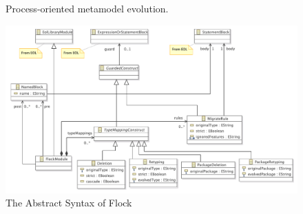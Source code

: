 \begin{figure}
	\centering
	\caption{Process-oriented metamodel evolution.}
\label{fig:po_mms}
\end{figure}

\begin{figure}
	\centering
		\includegraphics{images/FlockAbstractSyntax.pdf}
	\caption{The Abstract Syntax of Flock}
	\label{fig:flock_abstract_syntax}
\end{figure}



